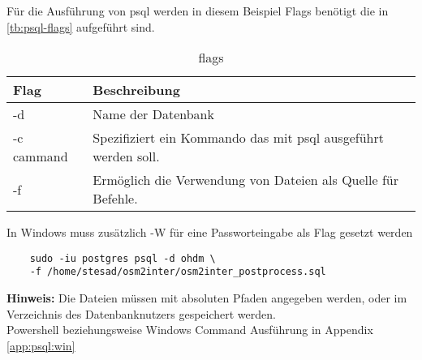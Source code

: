 Für die Ausführung von psql werden in diesem Beispiel Flags benötigt die in \autoref{tb:psql-flags} aufgeführt sind.
\begin{table}[h]
	\caption{flags}
	\label{tb:psql-flags}
	\renewcommand{\arraystretch}{1.5}
	\begin{tabularx}{\linewidth}{|l|X|}\hline
		Flag & Beschreibung\\\hline
		-d & Name der Datenbank \\\hline
		-c cammand & Spezifiziert ein Kommando das mit psql ausgeführt werden soll. \\\hline
		-f & Ermöglich die Verwendung von Dateien als Quelle für Befehle.\\\hline
	\end{tabularx}\vspace{0.5cm}
	In Windows muss zusätzlich -W für eine Passworteingabe als Flag gesetzt werden
\end{table}
\begin{lstlisting}
	sudo -iu postgres psql -d ohdm \
	-f /home/stesad/osm2inter/osm2inter_postprocess.sql
\end{lstlisting}
\textbf{Hinweis:} Die Dateien müssen mit absoluten Pfaden angegeben werden, oder im Verzeichnis des Datenbanknutzers gespeichert werden.\\
Powershell beziehungsweise Windows Command Ausführung in Appendix \autoref{app:psql:win}
